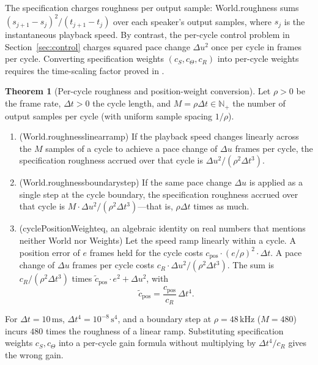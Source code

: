 \documentclass[11pt,a4paper]{article}
\DeclareRobustCommand{\lean}[1]{{\ttfamily\def\_{\textunderscore\allowbreak}#1}}
\theoremstyle{definition}
\newtheorem{theorem}[definition]{Theorem}
\begin{document}
The specification charges roughness per output sample:
\lean{World.roughness} sums $(s_{j+1} - s_j)^2 / (t_{j+1} - t_j)$ over each
speaker's output samples, where $s_j$ is the instantaneous playback speed. By
contrast, the per-cycle control problem in Section~\ref{sec:control} charges
squared pace change $\Delta u^2$ once per cycle in frames per cycle. Converting
specification weights $(c_S, c_\Theta, c_R)$ into per-cycle weights requires
the time-scaling factor proved in .

\begin{theorem}[Per-cycle roughness and position-weight conversion]
\label{thm:weight-conv}
Let $\rho > 0$ be the frame rate, $\Delta t > 0$ the cycle length, and
$M = \rho\Delta t \in \mathbb{N}_+$ the number of output samples per cycle
(with uniform sample spacing $1/\rho$).
\begin{enumerate}
\item (\lean{World.roughness\_linear\_ramp}) If the playback speed changes
  linearly across the $M$ samples of a cycle to achieve a pace change of
  $\Delta u$ frames per cycle, the specification roughness accrued over that
  cycle is $\Delta u^2 / (\rho^2 \Delta t^3)$.
\item (\lean{World.roughness\_boundary\_step}) If the same pace change
  $\Delta u$ is applied as a single step at the cycle boundary, the
  specification roughness accrued over that cycle is
  $M \cdot \Delta u^2 / (\rho^2 \Delta t^3)$—that is, $\rho\Delta t$ times as
  much.
\item (\lean{cyclePositionWeight\_eq}, an algebraic identity on real numbers
  that mentions neither \lean{World} nor \lean{Weights}) Let the speed ramp
  linearly within a cycle. A position error of $e$ frames held for the cycle
  costs $c_{\mathrm{pos}}\cdot(e / \rho)^2\cdot\Delta t$. A pace change of
  $\Delta u$ frames per cycle costs $c_R\cdot\Delta u^2 / (\rho^2 \Delta t^3)$.
  The sum is $c_R / (\rho^2 \Delta t^3)$ times
  $\tilde c_{\mathrm{pos}}\cdot e^2 + \Delta u^2$, with
  \[
    \tilde c_{\mathrm{pos}} = \frac{c_{\mathrm{pos}}}{c_R}\,\Delta t^4 .
  \]
\end{enumerate}
\end{theorem}

For $\Delta t = 10\,\text{ms}$, $\Delta t^4 = 10^{-8}\,\text{s}^4$, and a
boundary step at $\rho = 48\,\text{kHz}$ ($M = 480$) incurs $480$ times the
roughness of a linear ramp. Substituting specification weights $c_S, c_\Theta$
into a per-cycle gain formula without multiplying by $\Delta t^4 / c_R$ gives
the wrong gain.
\end{document}
